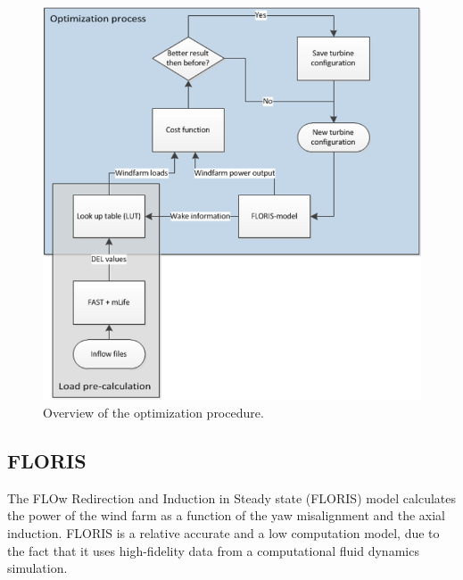 	\begin{figure}
		\includegraphics[width=\linewidth]{./Figures/OptimizationProcess.png}
		\caption{Overview of the optimization procedure.}
		\label{fig:optim}
	\end{figure}


  


\subsection{FLORIS} The FLOw Redirection and Induction in Steady state (FLORIS) model calculates the power of the wind farm as a function of the yaw misalignment and the axial induction. \cite{Gebraad2016}
FLORIS is a relative accurate\cite{Dijk2016} and a low computation model, due to the fact that it uses high-fidelity data from a computational fluid dynamics simulation. 

